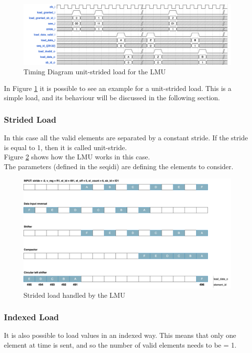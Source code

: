 \begin{figure}[H]
    \centering
    \includegraphics[scale = 0.35]{Chapter_2/img/lmu-time.png}
    \caption{Timing Diagram unit-strided load for the LMU}
    \label{lmu-time}
\end{figure}

In Figure \ref{lmu-time} it is possible to see an example for a unit-strided load. This is a simple load, and its behaviour will be discussed in the following section.

\subsubsection{Strided Load}
In this case all the valid elements are separated by a constant stride. If the stride is equal to 1, then it is called unit-stride.\\

Figure \ref{lmu-strided} shows how the LMU works in this case.\\
The parameters (defined in the seq\+id\+i) are defining the elements to consider.
\begin{figure}[H]
    \centering
    \includegraphics[scale = 0.25]{Chapter_2/img/lmu-strided.png}
    \caption{Strided load handled by the LMU}
    \label{lmu-strided}
\end{figure}

\subsubsection{Indexed Load}
It is also possible to load values in an indexed way. This means that only one element at time is sent, and so the number of valid elements needs to be = 1.\\


